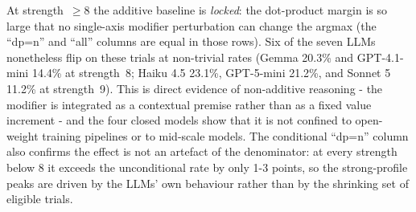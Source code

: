 At strength~$\geq 8$ the additive baseline is \emph{locked}: the dot-product margin is so large that no single-axis modifier perturbation can change the argmax (the ``dp=n'' and ``all'' columns are equal in those rows). Six of the seven LLMs nonetheless flip on these trials at non-trivial rates (Gemma 20.3\% and GPT-4.1-mini 14.4\% at strength~8; Haiku 4.5 23.1\%, GPT-5-mini 21.2\%, and Sonnet 5 11.2\% at strength~9). This is direct evidence of non-additive reasoning - the modifier is integrated as a contextual premise rather than as a fixed value increment - and the four closed models show that it is not confined to open-weight training pipelines or to mid-scale models. The conditional ``dp=n'' column also confirms the effect is not an artefact of the denominator: at every strength below 8 it exceeds the unconditional rate by only 1-3 points, so the strong-profile peaks are driven by the LLMs' own behaviour rather than by the shrinking set of eligible trials.
